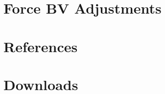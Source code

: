 \documentclass{article}
\newcommand{\mysectiontitle}{}
\newcommand{\newsection}[2]{\renewcommand{\mysectiontitle}{#2}\section{#1}}
\begin{document}


\newpage

\newsection{Force BV Adjustments}{bv-adjustments}
\label{sec:force_bv_adjustments}



\newpage

\newsection{References}{references}
\label{sec:references}



\newpage

\newsection{Downloads}{downloads}
\label{sec:downloads}



\newpage
\end{document}
